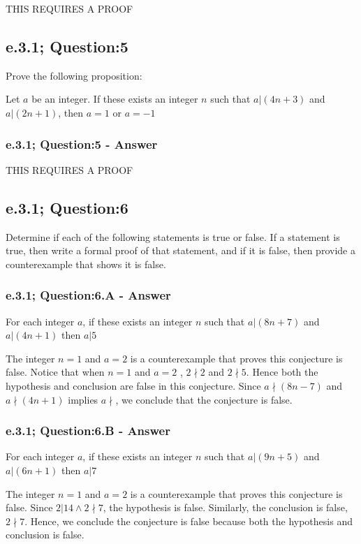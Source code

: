 THIS REQUIRES A PROOF


\subsection{e.3.1; Question:5}
Prove the following proposition: 
	\begin{center}
		Let $a$ be an integer. If these exists an integer $n$ such that $a|(4n + 3)$ and $a|(2n +1)$, then $a=1$ or $a = -1$
	\end{center}

\subsubsection*{e.3.1; Question:5 - Answer}

THIS REQUIRES A PROOF


\newpage
\subsection{e.3.1; Question:6}
Determine if each of the following statements is true or false. If a statement is true, then write a formal proof of that statement, and if it is false, then provide a counterexample that shows it is false. 

\subsubsection*{e.3.1; Question:6.A - Answer}
For each integer $a$, if these exists an integer $n$ such that $a | (8n + 7)$ and $a | (4n + 1)$ then $a|5$

The integer $n=1$ and $a=2$ is a counterexample that proves this conjecture is false. Notice that when $n=1$ and $a=2$ , $2 \nmid 2$ and $2 \nmid 5$. Hence both the hypothesis and conclusion are false in this conjecture. Since $a \nmid (8n - 7)$ and $a \nmid (4n + 1)$ implies $a \nmid $, we conclude that the conjecture is false.  

\subsubsection*{e.3.1; Question:6.B - Answer}
For each integer $a$, if these exists an integer $n$ such that $a | (9n + 5)$ and $a | (6n + 1)$ then $a|7$

The integer $n=1$ and $a=2$ is a counterexample that proves this conjecture is false. Since $2|14 \wedge 2 \nmid 7$, the hypothesis is false. Similarly, the conclusion is false, $2 \nmid 7$. Hence, we conclude the conjecture is false because both the hypothesis and conclusion is false.   


